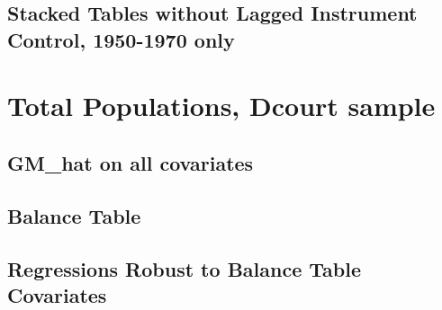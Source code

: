 \documentclass{article}
\begin{document}
\subsection{Stacked Tables without Lagged Instrument Control, 1950-1970 only}


\clearpage


\clearpage


\section{Total Populations, Dcourt sample}
\subsection{GM\_hat on all covariates}

\clearpage
\subsection{Balance Table}

\clearpage
\subsection{Regressions Robust to Balance Table Covariates}
\begin{landscape}

\clearpage

\clearpage

\clearpage

\clearpage
\end{landscape}
\end{document}
